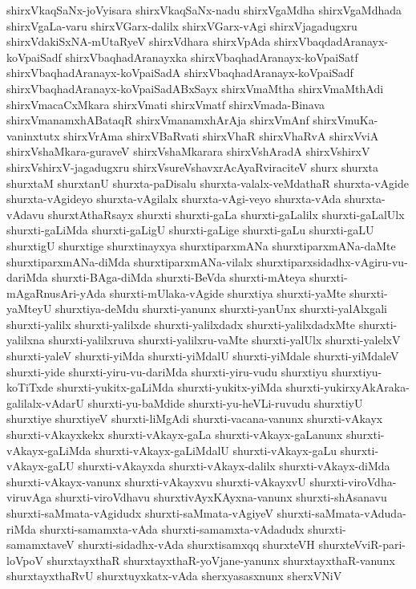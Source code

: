 {shirxVkaqSaNx-joVyisara
shirxVkaqSaNx-nadu
shirxVgaMdha
shirxVgaMdhada
shirxVgaLa-varu
shirxVGarx-dalilx
shirxVGarx-vAgi
shirxVjagadugxru
shirxVdakiSxNA-mUtaRyeV
shirxVdhara
shirxVpAda
shirxVbaqdadAranayx-koVpaiSadf
shirxVbaqhadAranayxka
shirxVbaqhadAranayx-koVpaiSatf
shirxVbaqhadAranayx-koVpaiSadA
shirxVbaqhadAranayx-koVpaiSadf
shirxVbaqhadAranayx-koVpaiSadABxSayx
shirxVmaMtha
shirxVmaMthAdi
shirxVmacaCxMkara
shirxVmati
shirxVmatf
shirxVmada-Binava
shirxVmanamxhABataqR
shirxVmanamxhArAja
shirxVmAnf
shirxVmuKa-vaninxtutx
shirxVrAma
shirxVBaRvati
shirxVhaR
shirxVhaRvA
shirxVviA
shirxVshaMkara-guraveV
shirxVshaMkarara
shirxVshAradA
shirxVshirxV
shirxVshirxV-jagadugxru
shirxVsureVshavxrAcAyaRviraciteV
shurx
shurxta
shurxtaM
shurxtanU
shurxta-paDisalu
shurxta-valalx-veMdathaR
shurxta-vAgide
shurxta-vAgideyo
shurxta-vAgilalx
shurxta-vAgi-veyo
shurxta-vAda
shurxta-vAdavu
shurxtAthaRsayx
shurxti
shurxti-gaLa
shurxti-gaLalilx
shurxti-gaLalUlx
shurxti-gaLiMda
shurxti-gaLigU
shurxti-gaLige
shurxti-gaLu
shurxti-gaLU
shurxtigU
shurxtige
shurxtinayxya
shurxtiparxmANa
shurxtiparxmANa-daMte
shurxtiparxmANa-diMda
shurxtiparxmANa-vilalx
shurxtiparxsidadhx-vAgiru-vu-dariMda
shurxti-BAga-diMda
shurxti-BeVda
shurxti-mAteya
shurxti-mAgaRnusAri-yAda
shurxti-mUlaka-vAgide
shurxtiya
shurxti-yaMte
shurxti-yaMteyU
shurxtiya-deMdu
shurxti-yanunx
shurxti-yanUnx
shurxti-yalAlxgali
shurxti-yalilx
shurxti-yalilxde
shurxti-yalilxdadx
shurxti-yalilxdadxMte
shurxti-yalilxna
shurxti-yalilxruva
shurxti-yalilxru-vaMte
shurxti-yalUlx
shurxti-yalelxV
shurxti-yaleV
shurxti-yiMda
shurxti-yiMdalU
shurxti-yiMdale
shurxti-yiMdaleV
shurxti-yide
shurxti-yiru-vu-dariMda
shurxti-yiru-vudu
shurxtiyu
shurxtiyu-koTiTxde
shurxti-yukitx-gaLiMda
shurxti-yukitx-yiMda
shurxti-yukirxyAkAraka-galilalx-vAdarU
shurxti-yu-baMdide
shurxti-yu-heVLi-ruvudu
shurxtiyU
shurxtiye
shurxtiyeV
shurxti-liMgAdi
shurxti-vacana-vanunx
shurxti-vAkayx
shurxti-vAkayxkekx
shurxti-vAkayx-gaLa
shurxti-vAkayx-gaLanunx
shurxti-vAkayx-gaLiMda
shurxti-vAkayx-gaLiMdalU
shurxti-vAkayx-gaLu
shurxti-vAkayx-gaLU
shurxti-vAkayxda
shurxti-vAkayx-dalilx
shurxti-vAkayx-diMda
shurxti-vAkayx-vanunx
shurxti-vAkayxvu
shurxti-vAkayxvU
shurxti-viroVdha-viruvAga
shurxti-viroVdhavu
shurxtivAyxKAyxna-vanunx
shurxti-shAsanavu
shurxti-saMmata-vAgidudx
shurxti-saMmata-vAgiyeV
shurxti-saMmata-vAduda-riMda
shurxti-samamxta-vAda
shurxti-samamxta-vAdadudx
shurxti-samamxtaveV
shurxti-sidadhx-vAda
shurxtisamxqq
shurxteVH
shurxteVviR-pari-loVpoV
shurxtayxthaR
shurxtayxthaR-yoVjane-yanunx
shurxtayxthaR-vanunx
shurxtayxthaRvU
shurxtuyxkatx-vAda
sherxyasasxnunx
sherxVNiV
}
